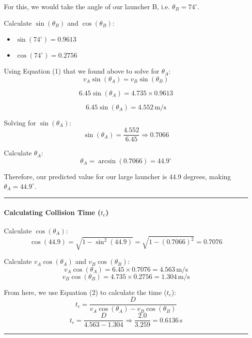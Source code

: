 \documentclass[12pt]{article}
\begin{document}
For this, we would take the angle of our launcher B, i.e. \( \theta_B = 74^\circ \).

Calculate \( \sin(\theta_B) \) and \( \cos(\theta_B) \):
\begin{itemize}
    \item \( \sin(74^\circ) = 0.9613 \)
    \item \( \cos(74^\circ) = 0.2756 \)
\end{itemize}

Using Equation (1) that we found above to solve for \( \theta_A \):
\[
v_A \sin(\theta_A) = v_B \sin(\theta_B)
\]

\[
6.45 \sin(\theta_A) = 4.735 \times 0.9613
\]

\[
6.45 \sin(\theta_A) = 4.552 \, \text{m/s}
\]

Solving for \( \sin(\theta_A) \):
\[
\sin(\theta_A) = \frac{4.552}{6.45} \Rightarrow 0.7066
\]

Calculate \( \theta_A \):
\[
\theta_A = \arcsin(0.7066) = 44.9^\circ
\]

Therefore, our predicted value for our large launcher is 44.9 degrees, making \( \theta_A = 44.9^\circ \).
\vspace{0.5cm} %
\begin{center}
    \rule{0.9\textwidth}{0.5pt} %
\end{center}
\vspace{0.5cm} %

\paragraph{\large \textbf{Calculating Collision Time (\( t_c \))}}

Calculate \( \cos(\theta_A) \):
\[
\cos(44.9) = \sqrt{1 - \sin^2(44.9)} = \sqrt{1 - (0.7066)^2} = 0.7076
\]

Calculate \( v_A \cos(\theta_A) \) and \( v_B \cos(\theta_B) \):
\[
v_A \cos(\theta_A) = 6.45 \times 0.7076 = 4.563 \, \text{m/s}
\]
\[
v_B \cos(\theta_B) = 4.735 \times 0.2756 = 1.304 \, \text{m/s}
\]

From here, we use Equation (2) to calculate the time (\( t_c \)):
\[
t_c = \frac{D}{v_A \cos(\theta_A) - v_B \cos(\theta_B)}
\]
\[
t_c = \frac{D}{4.563 - 1.304} \Rightarrow \frac{2.0}{3.259} = 0.6136 \, \text{s}
\]

\vspace{0.5cm} %
\begin{center}
    \rule{0.9\textwidth}{0.5pt} %
\end{center}
\vspace{0.5cm} %
\end{document}
